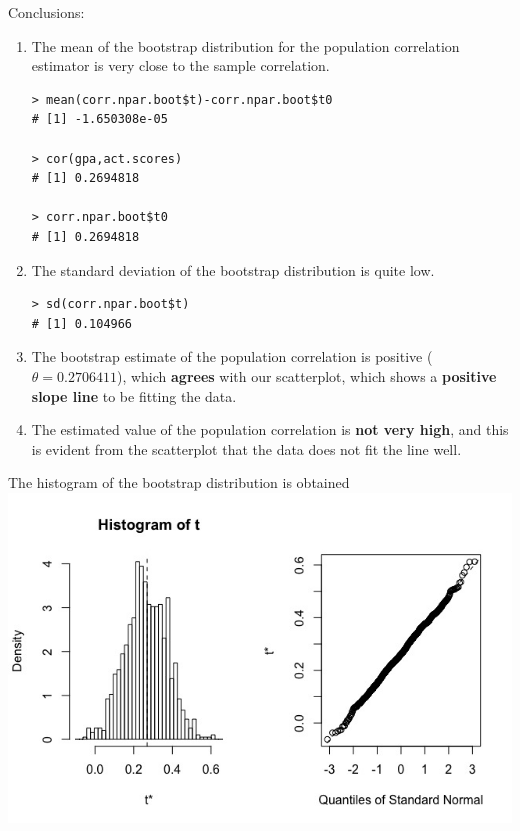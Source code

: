 \documentclass[12pt,letterpaper,titlepage,en-US]{article}
\begin{document}
Conclusions:
\begin{enumerate}
\item The mean of the bootstrap distribution for the population correlation  estimator is very close to the sample correlation.

\begin{knitrout}
\color{fgcolor}
\begin{kframe}
\begin{verbatim}
> mean(corr.npar.boot$t)-corr.npar.boot$t0
# [1] -1.650308e-05

> cor(gpa,act.scores)
# [1] 0.2694818 

> corr.npar.boot$t0
# [1] 0.2694818
\end{verbatim}
\end{kframe}
\end{knitrout}


\item The standard deviation of the bootstrap distribution is quite low.
\begin{knitrout}
\color{fgcolor}
\begin{kframe}
\begin{verbatim}
> sd(corr.npar.boot$t)
# [1] 0.104966
\end{verbatim}
\end{kframe}
\end{knitrout}

\item The bootstrap estimate of the population correlation is positive ($\theta=0.2706411$), which \textbf{agrees} with our scatterplot, which shows a \textbf{positive slope line} to be fitting the data.

\item The estimated value of the population correlation is \textbf{not very high}, and this is evident from the scatterplot that the data does not fit the line well.
\end{enumerate}

The histogram of the bootstrap distribution is obtained\\
\includegraphics[scale=0.6]{histBoot.jpeg}\\
\end{document}
